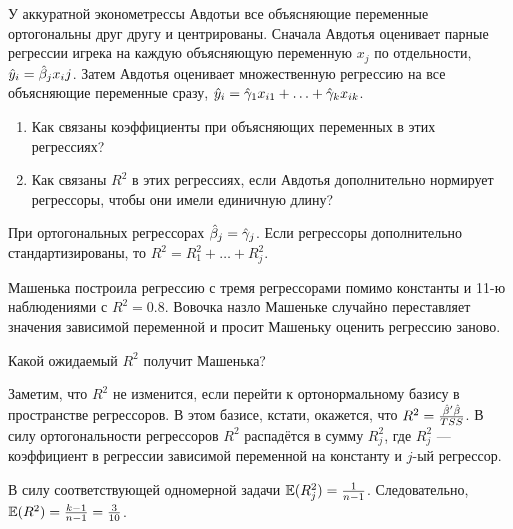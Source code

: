 \begin{problem}
У аккуратной эконометрессы Авдотьи все объясняющие переменные ортогональны друг другу и центрированы. Сначала Авдотья оценивает парные регрессии игрека на каждую объясняющую переменную $x_j$ по отдельности, $\hat{y}_i = \hat{\beta}_j x_ij$. Затем Авдотья оценивает множественную регрессию на  все объясняющие переменные сразу, $\hat{y}_i = \hat\gamma_1 x_{i1} + \ldots + \hat\gamma_{k} x_{ik}$.

\begin{enumerate}
\item Как связаны коэффициенты при объясняющих переменных в этих регрессиях?
\item Как связаны $R^2$ в этих регрессиях, если Авдотья дополнительно нормирует регрессоры, чтобы они имели единичную длину?
\end{enumerate}

\begin{sol}
При ортогональных регрессорах $\hat{\beta}_j = \hat\gamma_j$. Если регрессоры дополнительно стандартизированы, то $R^2 = R^2_1 + \ldots + R^2_j$.
\end{sol}
\end{problem}


\begin{problem}
Машенька построила регрессию с тремя регрессорами помимо константы и 11-ю наблюдениями с $R^2=0.8$. Вовочка назло Машеньке случайно переставляет значения зависимой переменной и просит Машеньку оценить регрессию заново.

Какой ожидаемый $R^2$ получит Машенька?
\begin{sol}
Заметим, что $R^2$ не изменится, если перейти к ортонормальному базису в пространстве регрессоров. В этом базисе, кстати, окажется, что $R^2 = \frac{\hat{\beta}'\hat{\beta}}{TSS}$. В силу ортогональности регрессоров $R^2$ распадётся в сумму $R^2_j$, где $R^2_j$ — коэффициент в регрессии зависимой переменной на константу и $j$-ый регрессор.

В силу соответствующей одномерной задачи $\mathbb{E}(R^2_j) = \frac{1}{n-1}$. Следовательно, $\mathbb{E}(R^2) = \frac{k-1}{n-1}=\frac{3}{10}$.
\end{sol}
\end{problem}


